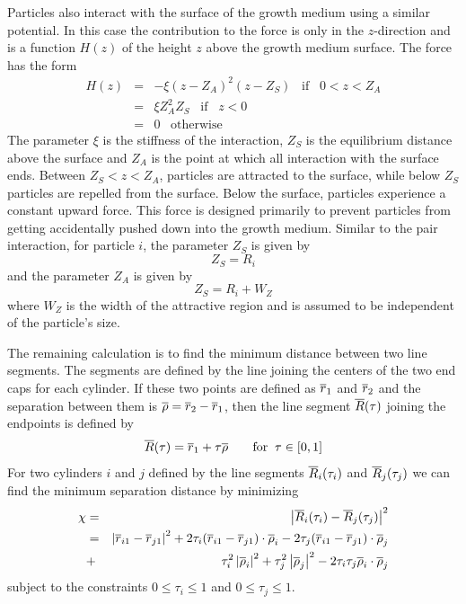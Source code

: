 \documentclass[12pt]{article}
\begin{document}
Particles also interact with the surface of the growth medium using a similar potential. In this
case the contribution to the force is only in the $z$-direction and is a function $H(z)$ of the height $z$ above
the growth medium surface. The force has the form
\begin{eqnarray*}
H(z) & = & -\xi (z-Z_A)^2(z-Z_S)\;\;\;\mbox{if}\;\;\;0<z<Z_A \\
& = & \xi Z_A^2Z_S\;\;\;\mbox{if}\;\;\;z<0 \\
& = & 0\;\;\;\mbox{otherwise}
\end{eqnarray*}
The parameter $\xi$ is the stiffness of the interaction, $Z_S$ is the equilibrium distance above the surface
and $Z_A$ is the point at which all interaction with the surface ends. Between $Z_S<z<Z_A$, particles are
attracted to the surface, while below $Z_S$ particles are repelled from the surface. Below the surface,
particles experience a constant upward force. This force is designed primarily to prevent particles from
getting accidentally pushed down into the growth medium. Similar to the pair interaction, for particle $i$,
the parameter $Z_S$ is given by
\[
Z_S = R_i
\]
and the parameter $Z_A$ is given by
\[
Z_S = R_i + W_Z
\]
where $W_Z$ is the width of the attractive region and is assumed to be independent of the particle's size.

The remaining calculation is to find the  minimum distance between two
line segments. The segments are defined by the line joining the centers of the two
end caps for each cylinder. If these two points are defined as $\overline{r}_1$ and $\overline{r}_2$
and the separation between them is $\overline{\rho} = \overline{r}_2-\overline{r}_1$, then the line
segment $\overline{R}(\tau)$ joining the endpoints is defined by
\[
\overline{R}(\tau) = \overline{r}_1 +\tau\overline{\rho}\;\;\;\;\;\;\;\mbox{for}\;\;\tau\in [0,1]
\]
For two cylinders $i$ and $j$ defined by the line segments $\overline{R}_i(\tau_i)$ and
$\overline{R}_j(\tau_j)$ we can find the minimum separation distance by minimizing
\begin{eqnarray*}
\chi & = & \left|\overline{R}_i(\tau_i)-\overline{R}_j(\tau_j)\right|^2 \\
     & = & \left|\overline{r}_{i1}-\overline{r}_{j1}\right|^2+2\tau_i(\overline{r}_{i1}-\overline{r}_{j1})\cdot\overline{\rho}_i
          -2\tau_j(\overline{r}_{i1}-\overline{r}_{j1})\cdot\overline{\rho}_j \\
     & + & \tau_i^2\left|\overline{\rho}_i\right|^2 + \tau_j^2\left|\overline{\rho}_j\right|^2
           - 2\tau_i\tau_j\overline{\rho}_i\cdot\overline{\rho}_j
\end{eqnarray*}
subject to the constraints $0\le\tau_i\le 1$ and $0\le\tau_j\le 1$.
\end{document}
